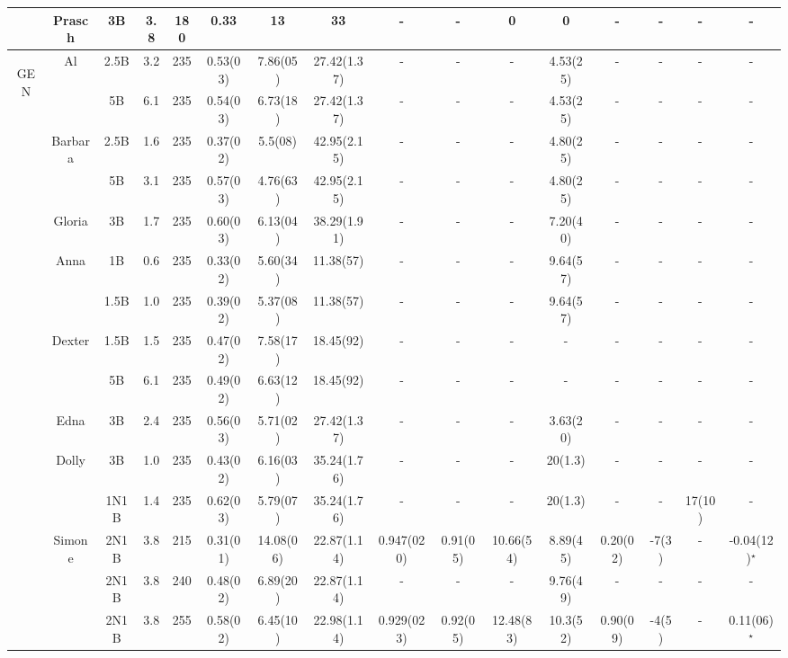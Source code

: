 \documentclass[pdftex,letterpaper,12pt]{report}
\begin{document}
\begin{table}
\begin{center}
\begin{tabular}{|c|c|ccc|ccc|ccccc|cc|c|}
			\cline{2-16}
			& Prasch & 3B & 3.8 & 180 & 0.33 & 13 & 33 & - & - & 0 & 0 & - & - & - & -\\
			\hline
			\hline
			\multirow{20}{*}{\begin{sideways}GEN\end{sideways}} & \multirow{2}{*}{Al} & 2.5B & 3.2 & 235 & 0.53(03) & 7.86(05) & 27.42(1.37) & - & - & - & 4.53(25) & - & - & - & - \\
			& & 5B & 6.1 & 235 & 0.54(03) & 6.73(18) & 27.42(1.37) & - & - & - & 4.53(25) & - & - & - & - \\
			\cline{2-16}
			& \multirow{2}{*}{Barbara} & 2.5B & 1.6 & 235 & 0.37(02) & 5.5(08) & 42.95(2.15) & - & - & - & 4.80(25) & - & - & - & - \\
			& & 5B & 3.1 & 235 & 0.57(03) & 4.76(63) & 42.95(2.15) & - & - & - & 4.80(25) & - & - & - & - \\
			\cline{2-16}
			& Gloria & 3B & 1.7 & 235 & 0.60(03) & 6.13(04) & 38.29(1.91) & - & - & - & 7.20(40) & - & - & - & - \\
			\cline{2-16}
			& \multirow{2}{*}{Anna} & 1B & 0.6 & 235 & 0.33(02) & 5.60(34) & 11.38(57) & - & - & - & 9.64(57) & - & - & - & - \\
			& & 1.5B & 1.0 & 235 & 0.39(02) & 5.37(08) & 11.38(57) & - & - & - & 9.64(57) & - & - & - & - \\
			\cline{2-16}
			& \multirow{2}{*}{Dexter} & 1.5B & 1.5 & 235 & 0.47(02) & 7.58(17) & 18.45(92) & - & - & - & - & - & - & - & - \\
			& & 5B & 6.1 & 235 & 0.49(02) & 6.63(12) & 18.45(92) & - & - & - & - & - & - & - & - \\
			\cline{2-16}
			& Edna & 3B & 2.4 & 235 & 0.56(03) & 5.71(02) & 27.42(1.37) & - & - & - & 3.63(20) & - & - & - & - \\
			\cline{2-16}
			& \multirow{2}{*}{Dolly} & 3B & 1.0 & 235 & 0.43(02) & 6.16(03) & 35.24(1.76) & - & - & - & 20(1.3) & - & - & - & - \\
			& & 1N1B & 1.4 & 235 & 0.62(03) & 5.79(07) & 35.24(1.76) & - & - & - & 20(1.3) & - & - & 17(10) & - \\
			\cline{2-16}
			& \multirow{3}{*}{Simone} & 2N1B & 3.8 & 215 & 0.31(01) & 14.08(06) & 22.87(1.14) & 0.947(020)  & 0.91(05) & 10.66(54) & 8.89(45) & 0.20(02) & -7(3) & - & -0.04(12)$^\star$ \\
			& & 2N1B & 3.8 & 240 & 0.48(02) & 6.89(20) & 22.87(1.14) & - & - & - & 9.76(49) & - & - & - & - \\
			& & 2N1B & 3.8 & 255 & 0.58(02) & 6.45(10) & 22.98(1.14) & 0.929(023) & 0.92(05) & 12.48(83) & 10.3(52) & 0.90(09) & -4(5) & - & 0.11(06)$^\star$ \\

\end{tabular}
\end{center}
\end{table}
\end{document}
